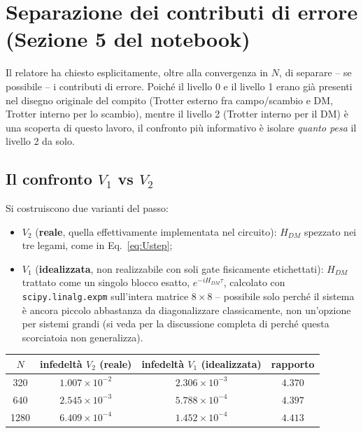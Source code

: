 \documentclass[11pt,a4paper]{article}
\begin{document}
\section{Separazione dei contributi di errore (Sezione 5 del notebook)}

Il relatore ha chiesto esplicitamente, oltre alla convergenza in $N$, di
separare -- se possibile -- i contributi di errore. Poiché il livello 0 e
il livello 1 erano già presenti nel disegno originale del compito (Trotter
esterno fra campo/scambio e DM, Trotter interno per lo scambio), mentre il
livello 2 (Trotter interno per il DM) è una scoperta di questo lavoro, il
confronto più informativo è isolare \emph{quanto pesa} il livello 2 da
solo.

\subsection{Il confronto $V_1$ vs $V_2$}

Si costruiscono due varianti del passo:
\begin{itemize}
\item $V_2$ (\textbf{reale}, quella effettivamente implementata nel
circuito): $H_{DM}$ spezzato nei tre legami, come in Eq.~\eqref{eq:Ustep};
\item $V_1$ (\textbf{idealizzata}, non realizzabile con soli gate
fisicamente etichettati): $H_{DM}$ trattato come un singolo blocco esatto,
$e^{-iH_{DM}\tau}$, calcolato con \texttt{scipy.linalg.expm} sull'intera
matrice $8\times8$ -- possibile solo perché il sistema è ancora piccolo
abbastanza da diagonalizzare classicamente, non un'opzione per sistemi
grandi (si veda \texttt{} per
la discussione completa di perché questa scorciatoia non generalizza).
\end{itemize}

\begin{center}
\begin{tabular}{@{}cccc@{}}
\toprule
$N$ & infedeltà $V_2$ (reale) & infedeltà $V_1$ (idealizzata) & rapporto \\
\midrule
320 & $1.007\times10^{-2}$ & $2.306\times10^{-3}$ & $4.370$ \\
640 & $2.545\times10^{-3}$ & $5.788\times10^{-4}$ & $4.397$ \\
1280 & $6.409\times10^{-4}$ & $1.452\times10^{-4}$ & $4.413$ \\
\bottomrule
\end{tabular}
\end{center}
\end{document}
